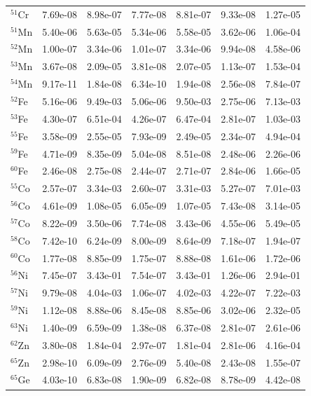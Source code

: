 \begin{table}
\begin{tabular}{l|cc|cc|cc}
$^{51}$Cr & 7.69e-08 & 8.98e-07 & 7.77e-08 & 8.81e-07 & 9.33e-08 & 1.27e-05\\
$^{51}$Mn & 5.40e-06 & 5.63e-05 & 5.34e-06 & 5.58e-05 & 3.62e-06 & 1.06e-04\\
$^{52}$Mn & 1.00e-07 & 3.34e-06 & 1.01e-07 & 3.34e-06 & 9.94e-08 & 4.58e-06\\
$^{53}$Mn & 3.67e-08 & 2.09e-05 & 3.81e-08 & 2.07e-05 & 1.13e-07 & 1.53e-04\\
$^{54}$Mn & 9.17e-11 & 1.84e-08 & 6.34e-10 & 1.94e-08 & 2.56e-08 & 7.84e-07\\
$^{52}$Fe & 5.16e-06 & 9.49e-03 & 5.06e-06 & 9.50e-03 & 2.75e-06 & 7.13e-03\\
$^{53}$Fe & 4.30e-07 & 6.51e-04 & 4.26e-07 & 6.47e-04 & 2.81e-07 & 1.03e-03\\
$^{55}$Fe & 3.58e-09 & 2.55e-05 & 7.93e-09 & 2.49e-05 & 2.34e-07 & 4.94e-04\\
$^{59}$Fe & 4.71e-09 & 8.35e-09 & 5.04e-08 & 8.51e-08 & 2.48e-06 & 2.26e-06\\
$^{60}$Fe & 2.46e-08 & 2.75e-08 & 2.44e-07 & 2.71e-07 & 2.84e-06 & 1.66e-05\\
$^{55}$Co & 2.57e-07 & 3.34e-03 & 2.60e-07 & 3.31e-03 & 5.27e-07 & 7.01e-03\\
$^{56}$Co & 4.61e-09 & 1.08e-05 & 6.05e-09 & 1.07e-05 & 7.43e-08 & 3.14e-05\\
$^{57}$Co & 8.22e-09 & 3.50e-06 & 7.74e-08 & 3.43e-06 & 4.55e-06 & 5.49e-05\\
$^{58}$Co & 7.42e-10 & 6.24e-09 & 8.00e-09 & 8.64e-09 & 7.18e-07 & 1.94e-07\\
$^{60}$Co & 1.77e-08 & 8.85e-09 & 1.75e-07 & 8.88e-08 & 1.61e-06 & 1.72e-06\\
$^{56}$Ni & 7.45e-07 & 3.43e-01 & 7.54e-07 & 3.43e-01 & 1.26e-06 & 2.94e-01\\
$^{57}$Ni & 9.79e-08 & 4.04e-03 & 1.06e-07 & 4.02e-03 & 4.22e-07 & 7.22e-03\\
$^{59}$Ni & 1.12e-08 & 8.88e-06 & 8.45e-08 & 8.85e-06 & 3.02e-06 & 2.32e-05\\
$^{63}$Ni & 1.40e-09 & 6.59e-09 & 1.38e-08 & 6.37e-08 & 2.81e-07 & 2.61e-06\\
$^{62}$Zn & 3.80e-08 & 1.84e-04 & 2.97e-07 & 1.81e-04 & 2.81e-06 & 4.16e-04\\
$^{65}$Zn & 2.98e-10 & 6.09e-09 & 2.76e-09 & 5.40e-08 & 2.43e-08 & 1.55e-07\\
$^{65}$Ge & 4.03e-10 & 6.83e-08 & 1.90e-09 & 6.82e-08 & 8.78e-09 & 4.42e-08\\
\hline
\end{tabular}
\end{table}
